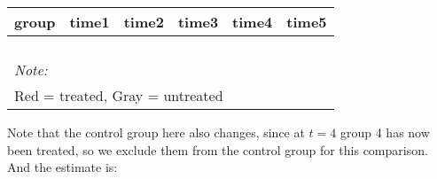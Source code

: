 \documentclass[
]{article}
\begin{document}
\begin{table}
\centering
\begin{tabular}[t]{>{}r|>{}r|>{}r|>{}r|>{}r|>{}r}
\hline
group & time1 & time2 & time3 & time4 & time5\\
\hline
\cellcolor{white}{2} & \cellcolor{red}{\textcolor{black}{0.631}} & \cellcolor{white}{0.711} & \cellcolor{white}{0.814} & \cellcolor{red}{\textcolor{black}{0.846}} & \cellcolor{white}{0.826}\\
\hline
\cellcolor{white}{3} & \cellcolor{white}{\textcolor{black}{0.678}} & \cellcolor{white}{0.770} & \cellcolor{white}{0.664} & \cellcolor{white}{\textcolor{black}{0.800}} & \cellcolor{white}{0.784}\\
\hline
\cellcolor{white}{4} & \cellcolor{white}{\textcolor{black}{0.778}} & \cellcolor{white}{0.807} & \cellcolor{white}{0.673} & \cellcolor{white}{\textcolor{black}{0.750}} & \cellcolor{white}{0.868}\\
\hline
\cellcolor{white}{5} & \cellcolor{lightgray}{\textcolor{black}{0.854}} & \cellcolor{white}{0.939} & \cellcolor{white}{0.854} & \cellcolor{lightgray}{\textcolor{black}{0.800}} & \cellcolor{white}{0.855}\\
\hline
\multicolumn{6}{l}{\rule{0pt}{1em}\textit{Note: }}\\
\multicolumn{6}{l}{\rule{0pt}{1em}Red = treated, Gray = untreated}\\
\end{tabular}
\end{table}

Note that the control group here also changes, since at \(t=4\) group 4
has now been treated, so we exclude them from the control group for this
comparison. And the estimate is:
\end{document}
